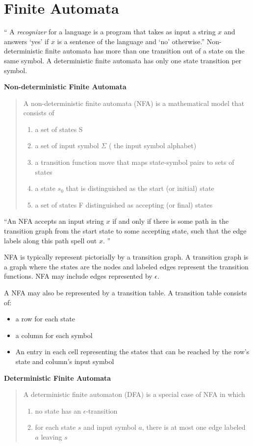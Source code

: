  \section{Finite  Automata}
`` A \textsl{recognizer} for a language is a program that takes as input a string $x$ and answers `yes' if $x$ is a sentence of the language and `no' otherwise.''  Non-deterministic finite automata has more than one transition out of a state on the same symbol.   A deterministic finite automata has only one state transition per symbol.  

\textbf {\Large Non-deterministic Finite Automata}
\begin{quote}
A non-deterministic finite automata (NFA) is a mathematical model that consists of 
\begin{enumerate}
\item a set of states S
\item a set of input symbol $\Sigma$ ( the input symbol alphabet)
\item a transition function move that maps state-symbol pairs to sets of states
\item a state $s_0$ that is distinguished as the start (or initial) state 
\item a set of states F distinguished as accepting (or final) states
\end{enumerate}
\end{quote}
\cite {ullman}
``An NFA accepts an input string $x$ if and only if there is some path in the transition graph from the start  state to some accepting state, such that the edge labels along this path spell out $x$. ''

NFA is typically represent pictorially by a transition graph.  A transition graph is a graph where the states are the nodes and labeled edges represent the transition functions.  NFA may include edges represented by $\epsilon$.  

A NFA may also be represented by a transition table.  A transition table consists of:
\begin{itemize}
\item a row for each state
\item a column for each symbol
\item An entry in each cell representing the states that can be reached by the row's state and column's input symbol
\end{itemize}

\textbf {\Large Deterministic Finite Automata}
\begin{quote}
A deterministic finite automaton (DFA) is a special case of NFA in which 
\begin{enumerate}
\item no state has an $\epsilon$-transition
\item for each state $s$ and input symbol $a$, there is at most one edge labeled $a$ leaving $s$
\end{enumerate}
\end{quote}

